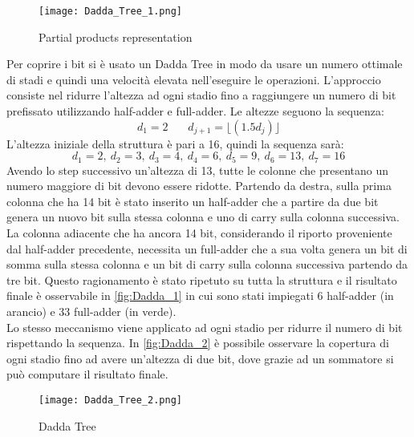 \begin{figure}[htb]
	\center
	\texttt{[image: Dadda\_Tree\_1.png]}
	\caption{Partial products representation}
	\label{fig:Dadda_1}
\end{figure}
Per coprire i bit si è usato un Dadda Tree in modo da usare un numero ottimale di stadi e quindi una velocità elevata nell'eseguire le operazioni. L'approccio consiste nel ridurre l'altezza ad ogni stadio fino a raggiungere un numero di bit prefissato utilizzando half-adder e full-adder. Le altezze seguono la sequenza:
$$
d_1 = 2 \ \ \ \ \ \ \ \ d_{j+1} = \lfloor(1.5d_j)\rfloor
$$
L'altezza iniziale della struttura è pari a 16, quindi la sequenza sarà:
$$
d_1 = 2,\ d_2 = 3,\ d_3 = 4,\
d_4 = 6,\ d_5 = 9,\ d_6 = 13,\ d_7 = 16
$$
Avendo lo step successivo un'altezza di 13, tutte le colonne che presentano un numero maggiore di bit devono essere ridotte. Partendo da destra, sulla prima colonna che ha 14 bit è stato inserito un half-adder che a partire da due bit genera un nuovo bit sulla stessa colonna e uno di carry sulla colonna successiva. La colonna adiacente che ha ancora 14 bit, considerando il riporto proveniente dal half-adder precedente, necessita un full-adder che a sua volta genera un bit di somma sulla stessa colonna e un bit di carry sulla colonna successiva partendo da tre bit. Questo ragionamento è stato ripetuto su tutta la struttura e il risultato finale è osservabile in \autoref{fig:Dadda_1} in cui sono stati impiegati 6 half-adder (in arancio) e 33 full-adder (in verde).\\
Lo stesso meccanismo viene applicato ad ogni stadio per ridurre il numero di bit rispettando la sequenza. In \autoref{fig:Dadda_2} è possibile osservare la copertura di ogni stadio fino ad avere un'altezza di due bit, dove grazie ad un sommatore si può computare il risultato finale.

\begin{figure}[htb]
	\center
	\texttt{[image: Dadda\_Tree\_2.png]}
	\caption{Dadda Tree }
	\label{fig:Dadda_2}
\end{figure}

